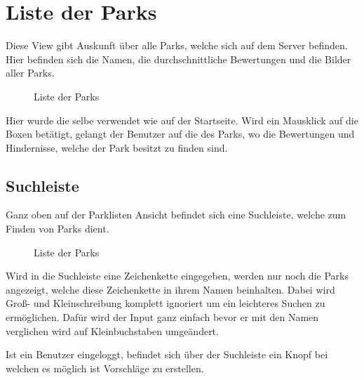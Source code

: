 \section{Liste der Parks}
\label{parklist}

Diese View gibt Auskunft über alle Parks, welche sich auf dem Server befinden. Hier befinden sich die 
Namen, die durchschnittliche Bewertungen und die Bilder aller Parks. 

\begin{figure}[H]
    \begin{center}
      \caption{Liste der Parks}
    \end{center}
\end{figure}

Hier wurde die selbe \underline{} verwendet wie auf der Startseite. Wird ein Mausklick auf die 
Boxen betätigt, gelangt der Benutzer auf die \underline{} des Parks, wo die Bewertungen und Hindernisse,
welche der Park besitzt zu finden sind. 

\subsection{Suchleiste}

Ganz oben auf der Parklisten Ansicht befindet sich eine Suchleiste, welche zum Finden von Parks dient.

\begin{figure}[H]
    \begin{center}
      \caption{Liste der Parks}
    \end{center}
\end{figure}

\newpage
Wird in die Suchleiste eine Zeichenkette eingegeben, werden nur noch die Parks angezeigt, welche diese 
Zeichenkette in ihrem Namen beinhalten. Dabei wird Groß- und Kleinschreibung komplett ignoriert um ein 
leichteres Suchen zu ermöglichen. Dafür wird der Input ganz einfach bevor er mit den Namen verglichen wird 
auf Kleinbuchstaben umgeändert.


Ist ein Benutzer eingeloggt, befindet sich über der Suchleiste ein Knopf bei welchen es möglich ist Vorschläge
zu erstellen.